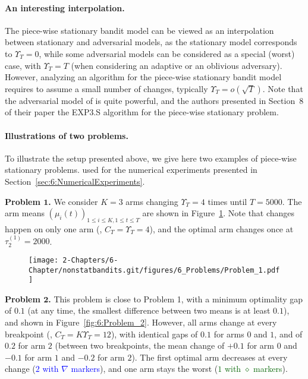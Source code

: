 \paragraph{An interesting interpolation.}
%
The piece-wise stationary bandit model can be viewed as an interpolation between stationary and adversarial models, as the stationary model corresponds to $\Upsilon_T = 0$, while some adversarial models can be considered as a special (worst) case, with $\Upsilon_T = T$ (when considering an adaptive or an oblivious adversary).
However, analyzing an algorithm for the piece-wise stationary bandit model requires to assume a small number of changes, typically $\Upsilon_T = o(\sqrt{T})$.
Note that the adversarial model of \cite{Auer02NonStochastic} is quite powerful, and the authors presented in Section~8 of their paper the EXP3.S algorithm for the piece-wise stationary problem.


\paragraph{Illustrations of two problems.}\label{par:6:benchmark1}

To illustrate the setup presented above, we give here two examples of piece-wise stationary problems.
used for the numerical experiments presented in Section~\ref{sec:6:NumericalExperiments}.

\textbf{Problem $\bm 1$.}
We consider $K=3$ arms changing $\Upsilon_T=4$ times until $T=5000$.
The arm means $(\mu_i(t))_{1\leq i\leq K,1\leq t\leq T}$ are shown in Figure~\ref{fig:6:Problem_1}.
Note that changes happen on only one arm (\ie, $C_T=\Upsilon_T=4$),
and the optimal arm changes once at $\tau_2^{(1)}=2000$.

\begin{figure}[h!]  %
    \centering
    \texttt{[image: 2-Chapters/6-Chapter/nonstatbandits.git/figures/6\_Problems/Problem\_1.pdf]}
    \label{fig:6:Problem_1}
\end{figure}


\textbf{Problem $\bm 2$.}
This problem is close to Problem 1, with a minimum optimality gap of $0.1$ (at any time, the smallest difference between two means is at least $0.1$),
and shown in Figure~\ref{fig:6:Problem_2}.
However, all arms change at every breakpoint (\ie, $C_T=K\Upsilon_T=12$), with identical gaps of $0.1$ for arms $0$ and $1$, and of $0.2$ for arm $2$ (between two breakpoints, the mean change of $+0.1$ for arm $0$ and $-0.1$ for arm $1$ and $-0.2$ for arm $2$).
The first optimal arm decreases at every change (\textcolor{blue}{$2$ with $\nabla$ markers}), and one arm stays the worst (\textcolor{darkgreen}{$1$ with $\diamond$ markers}).


